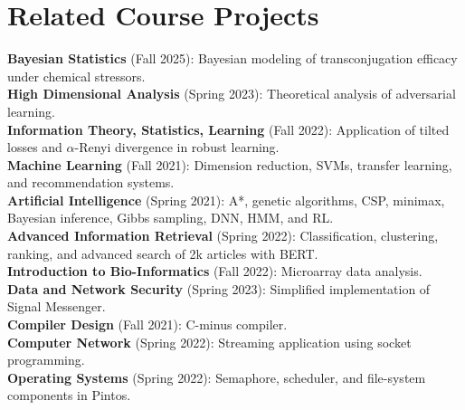 \section{Related Course Projects}
\small
\textbf{Bayesian Statistics} (Fall 2025): Bayesian modeling of transconjugation efficacy under chemical stressors.\\
\textbf{High Dimensional Analysis} (Spring 2023): Theoretical analysis of adversarial learning.\\
\textbf{Information Theory, Statistics, Learning} (Fall 2022): Application of tilted losses and $\alpha$-Renyi divergence in robust learning.\\
\textbf{Machine Learning} (Fall 2021): Dimension reduction, SVMs, transfer learning, and recommendation systems.\\
\textbf{Artificial Intelligence} (Spring 2021): A*, genetic algorithms, CSP, minimax, Bayesian inference, Gibbs sampling, DNN, HMM, and RL.\\
\textbf{Advanced Information Retrieval} (Spring 2022): Classification, clustering, ranking, and advanced search of 2k articles with BERT.\\
\textbf{Introduction to Bio-Informatics} (Fall 2022): Microarray data analysis.\\
\textbf{Data and Network Security} (Spring 2023): Simplified implementation of Signal Messenger.\\
\textbf{Compiler Design} (Fall 2021): C-minus compiler.\\
\textbf{Computer Network} (Spring 2022): Streaming application using socket programming.\\
\textbf{Operating Systems} (Spring 2022): Semaphore, scheduler, and file-system components in Pintos.
\normalsize
